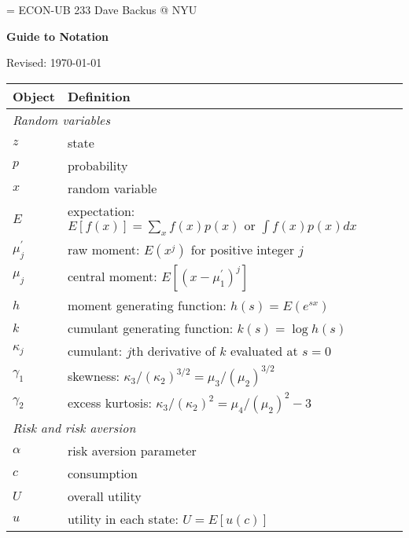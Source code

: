 \documentclass[11pt]{article}
\begin{document}
\parskip=\bigskipamount
\parindent=0.0in
\thispagestyle{empty}
{\large ECON-UB 233 \hfill Dave Backus @ NYU}

\bigskip\bigskip
\centerline{\Large \bf Guide to Notation}
\centerline{Revised: \today}

\bigskip
\begin{center}
\begin{tabular}{ll}
\toprule
Object    &  Definition    \\
\midrule
\multicolumn{2}{l}{\it Random variables}   \\
$z$ \hspace*{5em}& state \\
$p$ & probability \\
$x$ & random variable \\
$E$ & expectation:  $E[f(x)] = \sum_x f(x) p(x) \mbox{ or } \int f(x) p(x) dx $ \\ %
$\mu_j^\prime$ & raw moment: $ E(x^j)$ for positive integer $j$ \\
$\mu_j$         & central moment: $ E[(x-\mu_1^\prime)^j]$ \\
$h$         &  moment generating function:  $h(s) = E(e^{sx})$ \\
$k$         &  cumulant generating function:  $k(s) = \log h(s) $ \\
$\kappa_j$      & cumulant:  $j$th derivative of $k$ evaluated at $s=0$ \\

$\gamma_1$ & skewness:  $\kappa_3 /(\kappa_2)^{3/2} = \mu_3 /(\mu_2)^{3/2}$ \\
$\gamma_2$ & excess kurtosis:  $\kappa_3 /(\kappa_2)^{2} = \mu_4 /(\mu_2)^{2} - 3$ \\

\multicolumn{2}{l}{\it Risk and risk aversion}   \\
$\alpha$    &  risk aversion parameter \\
$c$         & consumption \\
$U$         & overall utility \\
$u$         & utility in each state:  $ U = E [u(c)] $ \\
\bottomrule
\end{tabular}
\end{center}


\end{document}
